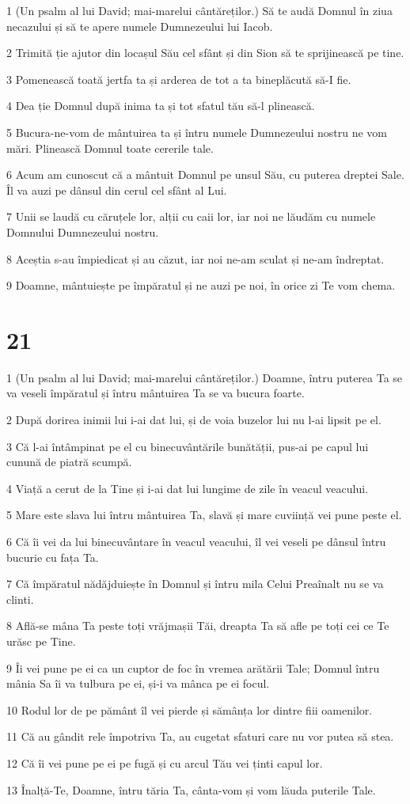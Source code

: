 \par 1 (Un psalm al lui David; mai-marelui cântăreților.) Să te audă Domnul în ziua necazului și să te apere numele Dumnezeului lui Iacob.
\par 2 Trimită ție ajutor din locașul Său cel sfânt și din Sion să te sprijinească pe tine.
\par 3 Pomenească toată jertfa ta și arderea de tot a ta bineplăcută să-I fie.
\par 4 Dea ție Domnul după inima ta și tot sfatul tău să-l plinească.
\par 5 Bucura-ne-vom de mântuirea ta și întru numele Dumnezeului nostru ne vom mări. Plinească Domnul toate cererile tale.
\par 6 Acum am cunoscut că a mântuit Domnul pe unsul Său, cu puterea dreptei Sale. Îl va auzi pe dânsul din cerul cel sfânt al Lui.
\par 7 Unii se laudă cu căruțele lor, alții cu caii lor, iar noi ne lăudăm cu numele Domnului Dumnezeului nostru.
\par 8 Aceștia s-au împiedicat și au căzut, iar noi ne-am sculat și ne-am îndreptat.
\par 9 Doamne, mântuiește pe împăratul și ne auzi pe noi, în orice zi Te vom chema.

\chapter{21}

\par 1 (Un psalm al lui David; mai-marelui cântăreților.) Doamne, întru puterea Ta se va veseli împăratul și întru mântuirea Ta se va bucura foarte.
\par 2 După dorirea inimii lui i-ai dat lui, și de voia buzelor lui nu l-ai lipsit pe el.
\par 3 Că l-ai întâmpinat pe el cu binecuvântările bunătății, pus-ai pe capul lui cunună de piatră scumpă.
\par 4 Viață a cerut de la Tine și i-ai dat lui lungime de zile în veacul veacului.
\par 5 Mare este slava lui întru mântuirea Ta, slavă și mare cuviință vei pune peste el.
\par 6 Că îi vei da lui binecuvântare în veacul veacului, îl vei veseli pe dânsul întru bucurie cu fața Ta.
\par 7 Că împăratul nădăjduiește în Domnul și întru mila Celui Preaînalt nu se va clinti.
\par 8 Află-se mâna Ta peste toți vrăjmașii Tăi, dreapta Ta să afle pe toți cei ce Te urăsc pe Tine.
\par 9 Îi vei pune pe ei ca un cuptor de foc în vremea arătării Tale; Domnul întru mânia Sa îi va tulbura pe ei, și-i va mânca pe ei focul.
\par 10 Rodul lor de pe pământ îl vei pierde și sămânța lor dintre fiii oamenilor.
\par 11 Că au gândit rele împotriva Ta, au cugetat sfaturi care nu vor putea să stea.
\par 12 Că îi vei pune pe ei pe fugă și cu arcul Tău vei ținti capul lor.
\par 13 Înalță-Te, Doamne, întru tăria Ta, cânta-vom și vom lăuda puterile Tale.

